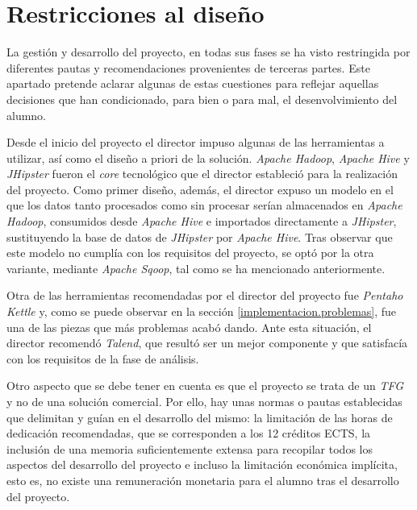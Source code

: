 \section{Restricciones al diseño} \label{disenyo.restricciones}
La gestión y desarrollo del proyecto, en todas sus fases se ha visto restringida por diferentes pautas y recomendaciones provenientes de terceras partes. Este apartado pretende aclarar algunas de estas cuestiones para reflejar aquellas decisiones que han condicionado, para bien o para mal, el desenvolvimiento del alumno. 
\par Desde el inicio del proyecto el director impuso algunas de las herramientas a utilizar, así como el diseño a priori de la solución. \textit{Apache Hadoop}, \textit{Apache Hive} y \textit{JHipster} fueron el \textit{core} tecnológico que el director estableció para la realización del proyecto. Como primer diseño, además, el director expuso un modelo en el que los datos tanto procesados como sin procesar serían almacenados en \textit{Apache Hadoop}, consumidos desde \textit{Apache Hive} e importados directamente a \textit{JHipster}, sustituyendo la base de datos de \textit{JHipster} por \textit{Apache Hive}. Tras observar que este modelo no cumplía con los requisitos del proyecto, se optó por la otra variante, mediante \textit{Apache Sqoop}, tal como se ha mencionado anteriormente. 
\par Otra de las herramientas recomendadas por el director del proyecto fue \textit{Pentaho Kettle} y, como se puede observar en la sección \ref{implementacion.problemas}, fue una de las piezas que más problemas acabó dando. Ante esta situación, el director recomendó \textit{Talend}, que resultó ser un mejor componente y que satisfacía con los requisitos de la fase de análisis.
\par Otro aspecto que se debe tener en cuenta es que el proyecto se trata de un \textit{TFG} y no de una solución comercial. Por ello, hay unas normas o pautas  establecidas que delimitan y guían en el desarrollo del mismo: la limitación de las horas de dedicación recomendadas, que se corresponden a los 12 créditos ECTS, la inclusión de una memoria suficientemente extensa para recopilar todos los aspectos del desarrollo del proyecto e incluso la limitación económica implícita, esto es, no existe una remuneración monetaria para el alumno tras el desarrollo del proyecto. 





